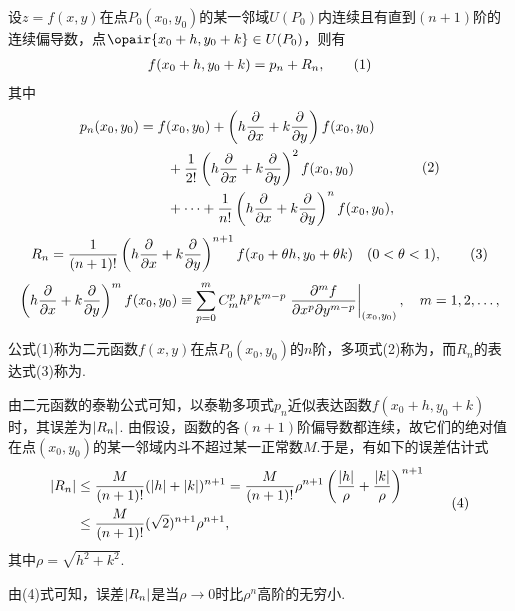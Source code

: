 \begin{theorem}\label{theorem:多元函数微分法.二元函数的泰勒公式}
\def\oprt#1{\left(h\pdv{x}+k\pdv{y}\right)\ifx\relax#1\relax\else^{#1}\fi}
设\(z=f(x,y)\)在点\(P_0(x_0,y_0)\)的某一邻域\(U(P_0)\)内连续且有直到\((n+1)\)阶的连续偏导数，点\(\opair{x_0+h,y_0+k} \in U(P_0)\)，则有
\begin{gather}
f(x_0+h,y_0+k) = p_n + R_n,
\tag1
\end{gather}
其中\begin{gather}
\label{equation:多元函数微分法.二元函数的泰勒多项式}
\begin{split}
p_n(x_0,y_0)
&=f(x_0,y_0)
 + \oprt{} f(x_0,y_0) \\
&\hspace{20pt}+ \frac{1}{2!} \oprt{2} f(x_0,y_0) \\
&\hspace{20pt}+ \dotsb + \frac{1}{n!} \oprt{n} f(x_0,y_0),
\end{split}
\tag2
\end{gather}
\begin{gather}
\label{equation:多元函数微分法.二元函数的泰勒公式的拉格朗日型余项}
R_n = \frac{1}{(n+1)!} \oprt{n+1} f(x_0+\theta h,y_0+\theta k)
\quad (0 < \theta < 1),
\tag3
\end{gather}\[
\oprt{m} f(x_0,y_0)
\equiv
\sum\limits_{p=0}^{m} C_m^p h^p k^{m-p}
 \eval{\frac{\partial^m f}{\partial x^p \partial y^{m-p}}}_{(x_0,y_0)},
\quad m=1,2,\dotsc,
\]

公式(1)称为二元函数\(f(x,y)\)在点\(P_0(x_0,y_0)\)的\(n\)阶，多项式(2)称为，而\(R_n\)的表达式(3)称为.
\end{theorem}
由二元函数的泰勒公式可知，以泰勒多项式\(p_n\)近似表达函数\(f(x_0+h,y_0+k)\)时，其误差为\(\abs{R_n}\).
由假设，函数的各\((n+1)\)阶偏导数都连续，故它们的绝对值在点\((x_0,y_0)\)的某一邻域内斗不超过某一正常数\(M\).于是，有如下的误差估计式\begin{gather}
\begin{split}
\abs{R_n}
&\leq \frac{M}{(n+1)!} (\abs{h}+\abs{k})^{n+1}
= \frac{M}{(n+1)!} \rho^{n+1} \left( \frac{\abs{h}}{\rho} + \frac{\abs{k}}{\rho} \right)^{n+1} \\
&\leq \frac{M}{(n+1)!} (\sqrt{2})^{n+1} \rho^{n+1},
\end{split}
\tag4
\end{gather}其中\(\rho=\sqrt{h^2+k^2}\).

由(4)式可知，误差\(\abs{R_n}\)是当\(\rho\to0\)时比\(\rho^n\)高阶的无穷小.

